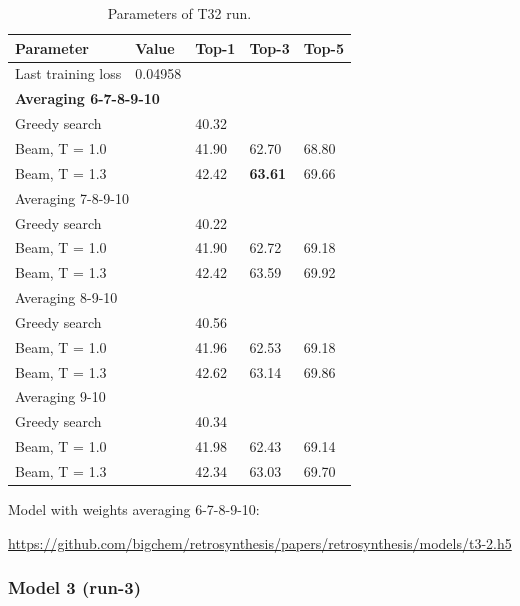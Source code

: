 \documentclass{article}
\begin{document}
\begin{table}[h!]
\caption{Parameters of T32 run.}
  \centering
  \begin{tabular}{p{8.2cm}p{1.5cm}p{1.5cm}p{1.5cm}p{1.5cm}}
    \toprule
    Parameter & Value & Top-1 & Top-3 & Top-5 \\
    \midrule
    Last training loss & 0.04958 & & & \\
    \midrule
    \multicolumn{5}{l}{\textbf{Averaging 6-7-8-9-10}} \\ \midrule
    Greedy search  & & 40.32 & & \\
    Beam, T = 1.0  & & 41.90 & 62.70 & 68.80  \\
    Beam, T = 1.3 & & 42.42 & \textbf{63.61} & 69.66 \\ 
    \midrule
    \multicolumn{5}{l}{Averaging 7-8-9-10} \\ \midrule
    Greedy search  & & 40.22 & & \\
    Beam, T = 1.0  & & 41.90 & 62.72 & 69.18  \\
    Beam, T = 1.3 & & 42.42 & 63.59 & 69.92 \\ \midrule
    \multicolumn{5}{l}{Averaging 8-9-10} \\ \midrule
    Greedy search  & & 40.56 & & \\
    Beam, T = 1.0  & & 41.96 & 62.53 & 69.18  \\
    Beam, T = 1.3 & & 42.62 & 63.14 & 69.86 \\ \midrule
    \multicolumn{5}{l}{Averaging 9-10} \\ \midrule
    Greedy search  & & 40.34 & & \\
    Beam, T = 1.0  & & 41.98 & 62.43 & 69.14  \\
    Beam, T = 1.3 & & 42.34 & 63.03 & 69.70 \\ 
    \bottomrule
  \end{tabular}
  \label{tbl:t32}
\end{table} 

Model with weights averaging 6-7-8-9-10:

\url{https://github.com/bigchem/retrosynthesis/papers/retrosynthesis/models/t3-2.h5}
\newpage


\subsubsection{Model 3 (run-3)}
 
\end{document}
